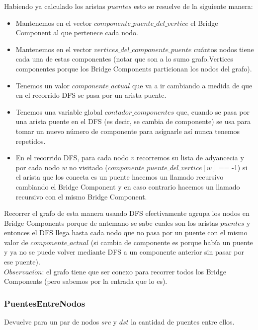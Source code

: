 Habiendo ya calculado los aristas $puentes$ esto se resuelve de la siguiente manera:
\begin{itemize}
	\item Mantenemos en el vector $componente\_puente\_del\_vertice$ el Bridge Component al que pertenece cada nodo.
	\item Mantenemos en el vector $vertices\_del\_componente\_puente$ cuántos nodos tiene cada una de estas componentes
	(notar que son a lo sumo grafo.Vertices componentes porque los Bridge Components particionan los nodos del grafo).
	\item Tenemos un valor $componente\_actual$ que va a ir cambiando a medida de que en el recorrido DFS se pasa por un arista puente.
	\item Tenemos una variable global $contador\_componentes$ que, cuando se pasa por una arista puente en el DFS (es decir, se cambia
	de componente) se usa para tomar un nuevo n\'umero de componente para as\'ignarle as\'i nunca tenemos repetidos.
	\item En el recorrido DFS, para cada nodo $v$ recorremos su lista de adyancecia y por cada nodo $w$ no visitado
	($componente\_puente\_del\_vertice[w]$ == -1) si el arista que los conecta es un puente hacemos un llamado recursivo cambiando el
	Bridge Component y en caso contrario hacemos un llamado recursivo con el mismo Bridge Component.
\end{itemize}

Recorrer el grafo de esta manera usando DFS efectivamente agrupa los nodos en Bridge Components porque de antemano se sabe cuales son 
los aristas $puentes$ y entonces el DFS llega hasta cada nodo que no pasa por un puente con el mismo valor de $componente\_actual$ (si
cambia de componente es porque había un puente y ya no se puede volver mediante DFS a un componente anterior sin pasar por ese puente). \\

$Observaci\acute{o}n$: el grafo tiene que ser conexo para recorrer todos los Bridge Components (pero sabemos por la entrada que lo es). \\

\subsubsection*{PuentesEntreNodos}

Devuelve para un par de nodos $src$ y $dst$ la cantidad de puentes entre ellos. \\

